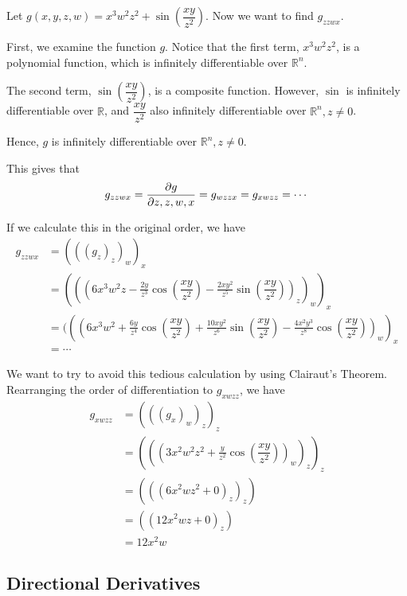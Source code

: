 \begin{example}
Let $g(x, y, z, w) = x^3w^2z^2+ \sin\left(\dfrac{xy}{z^2}\right)$.
Now we want to find $g_{zzwx}$.

First, we examine the function $g$.
Notice that the first term, $x^3w^2z^2$, is a polynomial function, which is infinitely differentiable over $\mathbb{R}^n$.

The second term, $\sin\left(\dfrac{xy}{z^2}\right)$, is a composite function. However, $\sin$ is infinitely differentiable over $\mathbb{R}$, and $\dfrac{xy}{z^2}$ also infinitely differentiable over $\mathbb{R}^n, z \neq 0$.

Hence, $g$ is infinitely differentiable over $\mathbb{R}^n, z \neq 0$.

This gives that 
\[
g_{zzwx} = \pdv{g}{z,z,w,x} = g_{wzzx} = g_{xwzz} = \cdots
\]

If we calculate this in the original order, we have
\begin{align*}
    g_{zzwx} &= (((g_z)_z)_w)_x \\
    &= (((6x^3w^2z - \frac{2y}{z^3}\cos\left(\dfrac{xy}{z^2}\right) - \frac{2xy^2}{z^5}\sin\left(\dfrac{xy}{z^2}\right))_z)_w)_x \\
    &= (((6x^3w^2 + \frac{6y}{z^4}\cos\left(\dfrac{xy}{z^2}\right) + \frac{10xy^2}{z^6}\sin\left(\dfrac{xy}{z^2}\right) - \frac{4x^2y^3}{z^8}\cos\left(\dfrac{xy}{z^2}\right))_w)_x \\
    &= \cdots
\end{align*}

We want to try to avoid this tedious calculation by using Clairaut's Theorem.
Rearranging the order of differentiation to $g_{xwzz}$, we have
\begin{align*}
    g_{xwzz} &= (((g_x)_w)_z)_z \\
    &= (((3x^2w^2z^2 + \frac{y}{z^2}\cos\left(\dfrac{xy}{z^2}\right))_w)_z)_z \\
    &= (((6x^2wz^2 + 0)_z)_z) \\
    &= ((12x^2wz + 0)_z) \\
    &= 12x^2w
\end{align*}
\end{example}


\subsection{Directional Derivatives}

